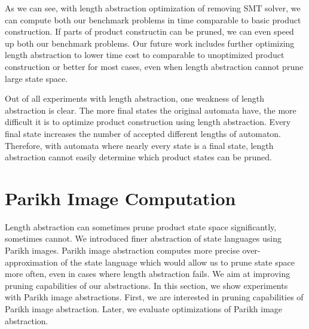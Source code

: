As we can see, with length abstraction optimization of removing SMT solver, we can compute both our benchmark problems in time comparable to basic product construction. If parts of product constructin can be pruned, we can even speed up both our benchmark problems. Our future work  includes further optimizing length abstraction to lower time cost to comparable to unoptimized product construction or better for most cases, even when length abstraction cannot prune large state space.

Out of all experiments with length abstraction, one weakness of length abstraction is clear. The more final states the original automata have, the more difficult it is to optimize product construction using length abstraction. Every final state increases the number of accepted different lengths of automaton. Therefore, with automata where nearly every state is a final state, length abstraction cannot easily determine which product states can be pruned.

\section{Parikh Image Computation}

Length abstraction can sometimes prune product state space significantly, sometimes cannot. We introduced finer abstraction of state languages using Parikh images. Parikh image abstraction computes more precise over-approximation of the state language which would allow us to prune state space more often, even in cases where length abstraction fails. We aim at improving pruning capabilities of our abstractions. In this section, we show experiments with Parikh image abstractions. First, we are interested in pruning capabilities of Parikh image abstraction. Later, we evaluate optimizations of Parikh image abstraction.


